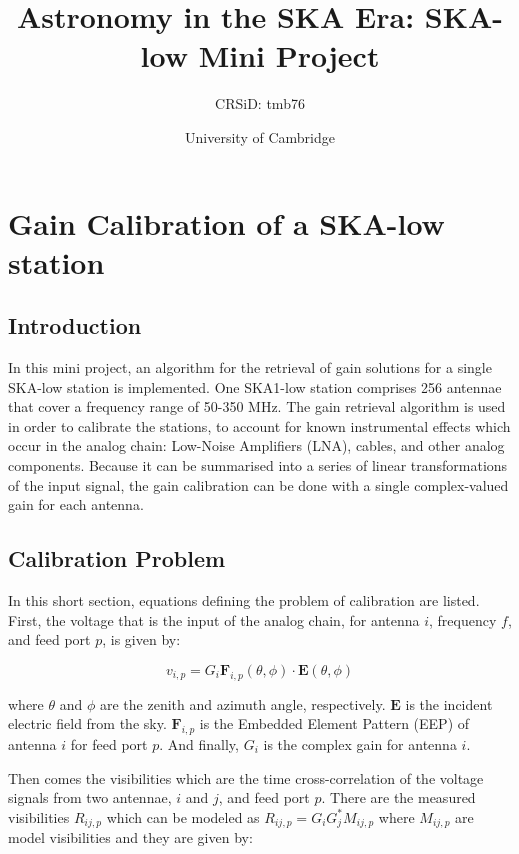 \documentclass[12pt]{report} %
\title{Astronomy in the SKA Era: SKA-low Mini Project}
\author{CRSiD: tmb76}
\date{University of Cambridge}
\begin{document}
\maketitle

\tableofcontents

\chapter*{Gain Calibration of a SKA-low station}

\section{Introduction}

In this mini project, an algorithm for the retrieval of gain solutions for a single SKA-low station is implemented. One SKA1-low station comprises 256 antennae that cover a frequency range of 50-350 MHz. The gain retrieval algorithm is used in order to calibrate the stations, to account for known instrumental effects which occur in the analog chain: Low-Noise Amplifiers (LNA), cables, and other analog components. Because it can be summarised into a series of linear transformations of the input signal, the gain calibration can be done with a single complex-valued gain for each antenna.

\section{Calibration Problem}

In this short section, equations defining the problem of calibration are listed. First, the voltage that is the input of the analog chain, for antenna $i$, frequency $f$, and feed port $p$, is given by:

\begin{equation}
    v_{i, p} = G_{i} \mathbf{F}_{i,p}(\theta, \phi) \cdot \mathbf{E}(\theta, \phi)
\end{equation}

where $\theta$ and $\phi$ are the zenith and azimuth angle, respectively. $\mathbf{E}$ is the incident electric field from the sky. $\mathbf{F}_{i,p}$ is the Embedded Element Pattern (EEP) of antenna $i$ for feed port $p$. And finally, $G_{i}$ is the complex gain for antenna $i$.

Then comes the visibilities which are the time cross-correlation of the voltage signals from two antennae, $i$ and $j$, and feed port $p$. There are the measured visibilities $R_{ij,p}$ which can be modeled as $R_{ij,p} = G_{i}G^{*}_{j}M_{ij,p}$ where $M_{ij,p}$ are model visibilities and they are given by:
\end{document}
